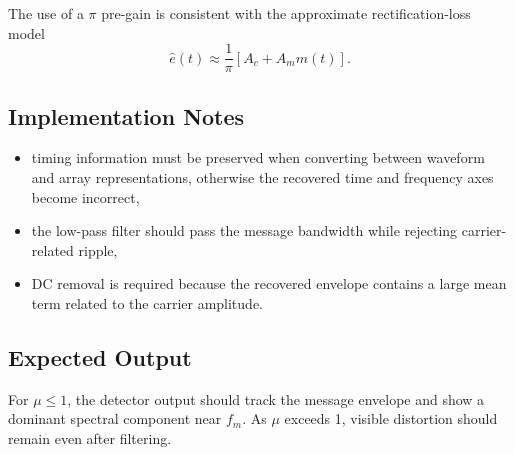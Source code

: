 The use of a $\pi$ pre-gain is consistent with the approximate rectification-loss
model
\begin{equation}
\hat{e}(t)\approx \frac{1}{\pi}\left[A_c + A_m m(t)\right].
\end{equation}

\subsection{Implementation Notes}

\begin{itemize}
\item timing information must be preserved when converting between waveform and
array representations, otherwise the recovered time and frequency axes become
incorrect,
\item the low-pass filter should pass the message bandwidth while rejecting
carrier-related ripple,
\item DC removal is required because the recovered envelope contains a large mean
term related to the carrier amplitude.
\end{itemize}

\subsection{Expected Output}

For $\mu \le 1$, the detector output should track the message envelope and show a
dominant spectral component near $f_m$. As $\mu$ exceeds 1, visible distortion
should remain even after filtering.
